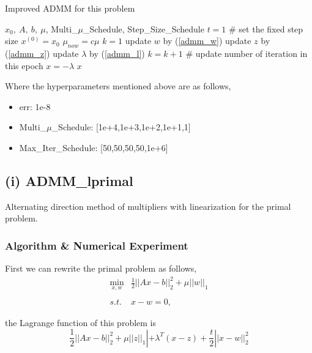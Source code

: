 \documentclass[]{article}
\begin{document}
\begin{algorithm}[!h]
	\caption{Improved ADMM for this problem}
	\label{iadmm_d}
	\begin{algorithmic}
		\REQUIRE $x_0, \ A,\  b,\  \mu $, Multi\_$\mu$\_Schedule, Step\_Size\_Schedule
		\STATE $t = 1$ \# set the fixed step size
		\STATE $x^{(0)}=x_0$
		\STATE $\mu_{now} = c\mu$
		\STATE $k = 1$
		\STATE update $w$ by (\ref{admm_w})
		\STATE update $z$ by (\ref{admm_z})
		\STATE update $\lambda$ by (\ref{admm_l})
		\STATE $k = k + 1$ \# update number of iteration in this epoch
		\ENDWHILE
		\ENDFOR
		\STATE $x = -\lambda$
		\ENSURE $x$
	\end{algorithmic}
\end{algorithm}

Where the hyperparameters mentioned above are as follows,

\begin{itemize}
	\item err: 1e-8
	\item Multi\_$\mu$\_Schedule: [1e+4,1e+3,1e+2,1e+1,1]
	\item Max\_Iter\_Schedule: [50,50,50,50,1e+6]
\end{itemize}

\subsection{(i) ADMM\_lprimal}
\noindent
Alternating direction method of multipliers with linearization for the primal problem.

\subsubsection{Algorithm \& Numerical Experiment}

First we can rewrite the primal problem as follows,
\begin{equation}\label{primal}
	\begin{array}{ll}
		\min_{x,w} & \frac{1}{2}||Ax-b||_2^2 + \mu||w||_1 \\
		&\\
		{s.t.} &  x-w=0,
	\end{array}
\end{equation}

the Lagrange function of this problem is
\begin{equation}
\frac{1}{2}||Ax-b||_2^2+\mu||z||_1|+\lambda^T(x-z)+\frac{t}{2}||x-w||_2^2
\end{equation}
\end{document}
